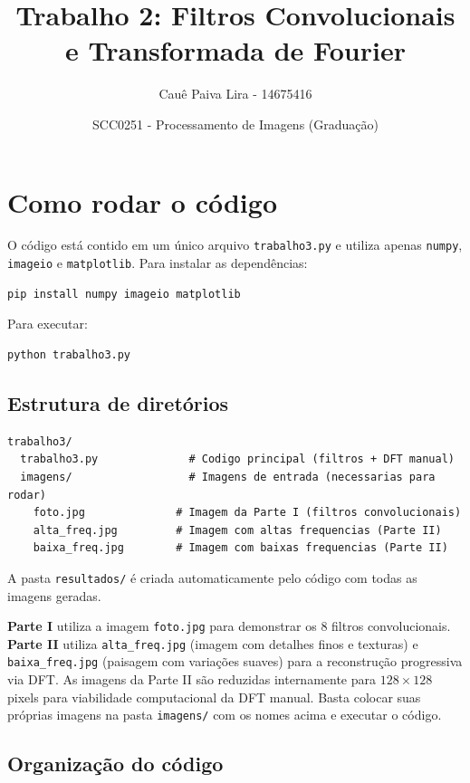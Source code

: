 \documentclass[12pt,a4paper]{article}
\title{Trabalho 2: Filtros Convolucionais e Transformada de Fourier}
\author{Cauê Paiva Lira - 14675416}
\date{SCC0251 - Processamento de Imagens (Graduação)}
\begin{document}
\maketitle

\section{Como rodar o código}

O código está contido em um único arquivo \texttt{trabalho3.py} e utiliza apenas \texttt{numpy}, \texttt{imageio} e \texttt{matplotlib}. Para instalar as dependências:

\begin{lstlisting}[language=bash]
pip install numpy imageio matplotlib
\end{lstlisting}

Para executar:

\begin{lstlisting}[language=bash]
python trabalho3.py
\end{lstlisting}

\subsection{Estrutura de diretórios}

\begin{lstlisting}
trabalho3/
  trabalho3.py              # Codigo principal (filtros + DFT manual)
  imagens/                  # Imagens de entrada (necessarias para rodar)
    foto.jpg              # Imagem da Parte I (filtros convolucionais)
    alta_freq.jpg         # Imagem com altas frequencias (Parte II)
    baixa_freq.jpg        # Imagem com baixas frequencias (Parte II)
\end{lstlisting}

A pasta \texttt{resultados/} é criada automaticamente pelo código com todas as imagens geradas.

\textbf{Parte I} utiliza a imagem \texttt{foto.jpg} para demonstrar os 8 filtros convolucionais. \textbf{Parte II} utiliza \texttt{alta\_freq.jpg} (imagem com detalhes finos e texturas) e \texttt{baixa\_freq.jpg} (paisagem com variações suaves) para a reconstrução progressiva via DFT. As imagens da Parte II são reduzidas internamente para $128 \times 128$ pixels para viabilidade computacional da DFT manual. Basta colocar suas próprias imagens na pasta \texttt{imagens/} com os nomes acima e executar o código.

\subsection{Organização do código}
\end{document}

